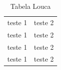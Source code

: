 \documentclass[a4paper, 12pt]{article}
\begin{document}
\begin{table}
	\centering
	\begin{tabular}{|c|c|}
		teste 1 & teste 2\\
		teste 1 & teste 2\\
		teste 1 & teste 2\\
		teste 1 & teste 2\\
	
	\end{tabular}
	\caption{Tabela Louca}
	\label{tabela-louca}
\end{table}

\newpage
 

\end{document}
